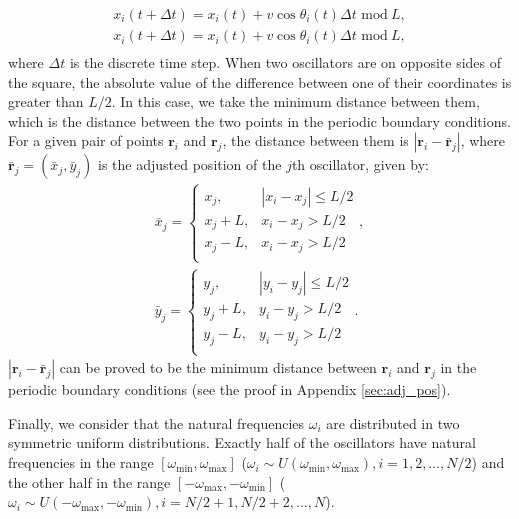 \documentclass[%
 aip,
 amsmath,amssymb,
 reprint,%
]{revtex4-1}
\begin{document}
\begin{equation}
    \begin{array}{c}
        x_i\left( t+\Delta t \right) =x_i\left( t \right) +v\cos \theta _i\left( t \right) \Delta t\,\,\mathrm{mod}\ L,\\
        x_i\left( t+\Delta t \right) =x_i\left( t \right) +v\cos \theta _i\left( t \right) \Delta t\,\,\mathrm{mod}\ L,\\
    \end{array}
\end{equation}
where $\Delta t$ is the discrete time step. When two oscillators are on opposite sides of the square, the absolute value of the difference between one of their coordinates is greater than $L/2$. In this case, we take the minimum distance between them, which is the distance between the two points in the periodic boundary conditions. For a given pair of points $\mathbf{r}_i$ and $\mathbf{r}_j$, the distance between them is $\left| \mathbf{r}_i-\bar{\mathbf{r}}_j \right|$, where $\bar{\mathbf{r}}_j=\left( \bar{x}_j,\bar{y}_j \right)$ is the adjusted position of the $j$th oscillator, given by:
\begin{eqnarray}\label{eq:adj_pos1}
    \bar{x}_j=\begin{cases}
        x_j,&		\left| x_i-x_j \right|\le L/2\\
        x_j+L,&		x_i-x_j>L/2\\
        x_j-L,&		x_i-x_j>L/2\\
    \end{cases},
    \\
    \bar{y}_j=\begin{cases}\label{eq:adj_pos2}
        y_j,&		\left| y_i-y_j \right|\le L/2\\
        y_j+L,&		y_i-y_j>L/2\\
        y_j-L,&		y_i-y_j>L/2\\
    \end{cases}.
\end{eqnarray}
$\left| \mathbf{r}_i-\bar{\mathbf{r}}_j \right|$ can be proved to be the minimum distance between $\mathbf{r}_i$ and $\mathbf{r}_j$ in the periodic boundary conditions (see the proof in Appendix \ref{sec:adj_pos}).

Finally, we consider that the natural frequencies $\omega_i$ are distributed in two symmetric uniform distributions. Exactly half of the oscillators have natural frequencies in the range $\left[ \omega _{\min},\omega _{\max} \right]$ ($\omega_i \sim U\left( \omega _{\min},\omega _{\max} \right), i=1,2,\ldots,N/2$) and the other half in the range $\left[ -\omega _{\max},-\omega _{\min} \right]$ ($\omega_i \sim U\left( -\omega _{\max},-\omega _{\min} \right), i=N/2+1,N/2+2,\ldots,N$).
\end{document}
